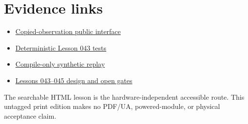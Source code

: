 \documentclass[11pt]{article}
\begin{document}
\section{Evidence links}
\begin{itemize}
 \item \href{https://github.com/spincyc/adk/blob/main/src/inertial_observation.h}
       {Copied-observation public interface}
 \item \href{https://github.com/spincyc/adk/blob/main/tests/test_inertial_observation.cpp}
       {Deterministic Lesson 043 tests}
 \item \href{https://github.com/spincyc/adk/blob/main/examples/Lesson043InertialObservation/Lesson043InertialObservation.ino}
       {Compile-only synthetic replay}
 \item \href{https://github.com/spincyc/adk/blob/main/docs/design/LESSONS_043_045_BALANCE_TABLE_PLAN.md}
       {Lessons 043--045 design and open gates}
\end{itemize}

The searchable HTML lesson is the hardware-independent accessible route.
This untagged print edition makes no PDF/UA, powered-module, or physical
acceptance claim.
\end{document}
